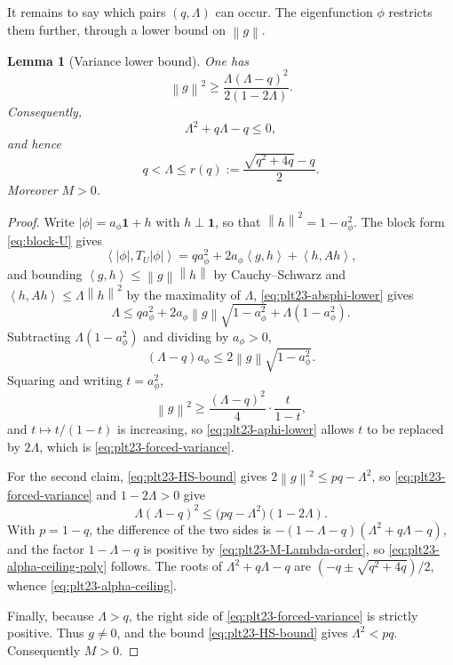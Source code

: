 \documentclass[11pt]{article}
\newtheorem{lemma}[theorem]{Lemma}
\numberwithin{equation}{section}
\newcommand{\one}{\mathbf 1}
\newcommand{\ip}[2]{\left\langle #1,#2\right\rangle}
\newcommand{\norm}[1]{\left\lVert #1\right\rVert}
\begin{document}
It remains to say which pairs $(q,\Lambda)$ can occur.
The eigenfunction $\phi$ restricts them further, through a lower bound on $\norm g$.

\begin{lemma}[Variance lower bound]\label{lem:plt23-forced-variance}
  One has
  \begin{equation}\label{eq:plt23-forced-variance}
    \norm g^2\ge
    \frac{\Lambda(\Lambda-q)^2}{2(1-2\Lambda)}.
  \end{equation}
  Consequently,
  \begin{equation}\label{eq:plt23-alpha-ceiling-poly}
    \Lambda^2+q\Lambda-q\le0,
  \end{equation}
  and hence
  \begin{equation}\label{eq:plt23-alpha-ceiling}
    q<\Lambda\le r(q):=
    \frac{\sqrt{q^2+4q}-q}{2}.
  \end{equation}
  Moreover $M>0$.
\end{lemma}

\begin{proof}
  Write $|\phi|=a_\phi\one+h$ with $h\perp\one$, so that $\norm h^2=1-a_\phi^2$.
  The block form \eqref{eq:block-U} gives
  \[
    \ip{|\phi|}{T_U|\phi|}
    =qa_\phi^2+2a_\phi\ip gh+\ip h{Ah},
  \]
  and bounding $\ip gh\le\norm g\norm h$ by Cauchy--Schwarz and $\ip h{Ah}\le\Lambda\norm h^2$ by the maximality of $\Lambda$, \eqref{eq:plt23-absphi-lower} gives
  \[
    \Lambda\le qa_\phi^2+2a_\phi\norm g\sqrt{1-a_\phi^2}
    +\Lambda(1-a_\phi^2).
  \]
  Subtracting $\Lambda(1-a_\phi^2)$ and dividing by $a_\phi>0$,
  \[
    (\Lambda-q)a_\phi
    \le2\norm g\sqrt{1-a_\phi^2}.
  \]
  Squaring and writing $t=a_\phi^2$,
  \[
    \norm g^2\ge\frac{(\Lambda-q)^2}{4}\cdot\frac{t}{1-t},
  \]
  and $t\mapsto t/(1-t)$ is increasing, so \eqref{eq:plt23-aphi-lower} allows $t$ to be replaced by $2\Lambda$, which is \eqref{eq:plt23-forced-variance}.

  For the second claim, \eqref{eq:plt23-HS-bound} gives $2\norm g^2\le pq-\Lambda^2$, so \eqref{eq:plt23-forced-variance} and $1-2\Lambda>0$ give
  \[
    \Lambda(\Lambda-q)^2\le\bigl(pq-\Lambda^2\bigr)(1-2\Lambda).
  \]
  With $p=1-q$, the difference of the two sides is $-(1-\Lambda-q)(\Lambda^2+q\Lambda-q)$, and the factor $1-\Lambda-q$ is positive by \eqref{eq:plt23-M-Lambda-order}, so \eqref{eq:plt23-alpha-ceiling-poly} follows.
  The roots of $\Lambda^2+q\Lambda-q$ are $(-q\pm\sqrt{q^2+4q})/2$, whence \eqref{eq:plt23-alpha-ceiling}.

  Finally, because $\Lambda>q$, the right side of \eqref{eq:plt23-forced-variance} is strictly positive.
  Thus $g\ne0$, and the bound \eqref{eq:plt23-HS-bound} gives $\Lambda^2<pq$.
  Consequently $M>0$.
\end{proof}
\end{document}
